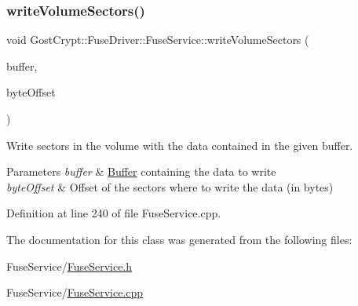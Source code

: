\subsubsection{\texorpdfstring{write\+Volume\+Sectors()}{writeVolumeSectors()}}
{\footnotesize\ttfamily void Gost\+Crypt\+::\+Fuse\+Driver\+::\+Fuse\+Service\+::write\+Volume\+Sectors (\begin{DoxyParamCaption}\item[{const \hyperlink{class_gost_crypt_1_1_buffer_ptr}{Buffer\+Ptr} \&}]{buffer,  }\item[{quint64}]{byte\+Offset }\end{DoxyParamCaption})\hspace{0.3cm}{\ttfamily [static]}}



Write sectors in the volume with the data contained in the given buffer. 


\begin{DoxyParams}{Parameters}
{\em buffer} & \hyperlink{class_gost_crypt_1_1_buffer}{Buffer} containing the data to write \\
\hline
{\em byte\+Offset} & Offset of the sectors where to write the data (in bytes) \\
\hline
\end{DoxyParams}


Definition at line 240 of file Fuse\+Service.\+cpp.



The documentation for this class was generated from the following files\+:\begin{DoxyCompactItemize}
\item 
Fuse\+Service/\hyperlink{_fuse_service_8h}{Fuse\+Service.\+h}\item 
Fuse\+Service/\hyperlink{_fuse_service_8cpp}{Fuse\+Service.\+cpp}\end{DoxyCompactItemize}
